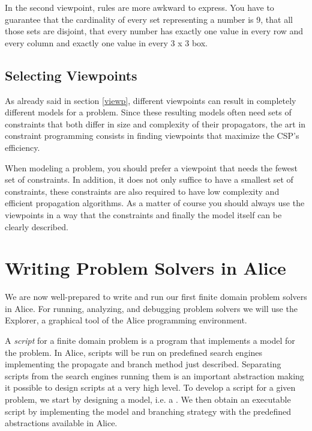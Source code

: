 \documentclass[a4paper,halfparskip]{scrartcl}
\begin{document}
In the second viewpoint, rules are more awkward to express.
You have to guarantee that the cardinality of every set representing
a number is 9, that all those sets are disjoint, that every number
has exactly one value in every row and every column and exactly one
value in every 3 x 3 box.

\subsection{Selecting Viewpoints}
As already said in section \ref{viewp}, different viewpoints can
result in completely different models for a problem. Since these
resulting models often need sets of constraints that both differ 
in size and complexity of their propagators, the art in constraint 
programming consists in finding viewpoints that maximize the CSP's
efficiency.

When modeling a problem, you should prefer a viewpoint that needs
the fewest set of constraints. In addition, it does not only suffice
to have a smallest set of constraints, these constraints are also
required to have low complexity and efficient propagation algorithms. 
As a matter of course you should always use the viewpoints in a way that
the constraints and finally the model itself can be clearly described.


\newpage
\section{Writing Problem Solvers in Alice}

We are now well-prepared to write and run our first finite 
domain problem solvers in Alice. 
For running, analyzing, and debugging problem solvers we 
will use the Explorer, a graphical 
tool of the Alice programming environment.

A \emph{script} for a finite domain problem is a program 
that implements a model for the problem. 
In Alice, scripts will be run on predefined 
search engines implementing the propagate 
and branch method just described. Separating scripts 
from the search engines running them 
is an important abstraction making it possible to design 
scripts at a very high level. To 
develop a script for a given problem, we start by designing 
a model, i.e. a . 
We then obtain an executable script by implementing the model 
and branching strategy with the 
predefined abstractions available in Alice. 
\end{document}
